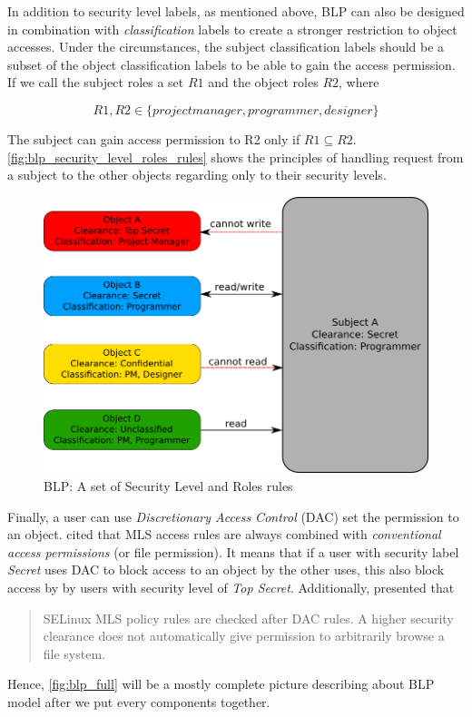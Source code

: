 In addition to security level labels, as mentioned above, BLP can also be designed in combination with \emph{classification} labels to create a stronger restriction to object accesses.
Under the circumstances, the subject classification labels should be a subset of the object classification labels to be able to gain the access permission.
If we call the subject roles a set $R1$ and the object roles $R2$, where

$$R1, R2 \in \{project manager, programmer, designer\}$$ 

The subject can gain access permission to R2 only if $R1 \subseteq R2$.
\autoref{fig:blp_security_level_roles_rules} shows the principles of handling request from a subject to the other objects regarding only to their security levels.

\begin{figure}[bth]
\myfloatalign
\includegraphics[width=1.0\linewidth]{gfx/chapter_2/blp_security_level_roles_rules}
\caption[BLP: A set of Security Level and Roles rules]{BLP: A set of Security Level and Roles rules}
\label{fig:blp_security_level_roles_rules}
\end{figure}

Finally, a user can use \emph{Discretionary Access Control} (DAC) set the permission to an object.
\cite{centos:2008} cited that MLS access rules are always combined with \emph{conventional access permissions} (or file permission).
It means that if a user with security label \emph{Secret} uses DAC to block access to an object by the other uses, this also block access by by users with security level of \emph{Top Secret}.
Additionally, \cite{bancinco:2015} presented that
\begin{quote}
SELinux MLS policy rules are checked after DAC rules. A higher security clearance does not automatically give permission to arbitrarily browse a file system.
\end{quote}
Hence, \autoref{fig:blp_full} will be a mostly complete picture describing about BLP model after we put every components together.


